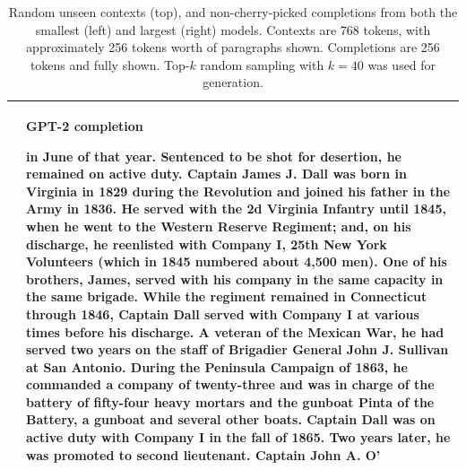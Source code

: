\documentclass{article}
\begin{document}
\begin{table}[t]
\begin{center}
\begin{tabular}{|p{8cm}|p{8cm}|}
  &
  \centerline{\textbf{GPT-2 completion}}
 in June of that year. Sentenced to be shot for desertion, he remained on active duty.
\newline\newline
Captain James J. Dall was born in Virginia in 1829 during the Revolution and joined his father in the Army in 1836. He served with the 2d Virginia Infantry until 1845, when he went to the Western Reserve Regiment; and, on his discharge, he reenlisted with Company I, 25th New York Volunteers (which in 1845 numbered about 4,500 men). One of his brothers, James, served with his company in the same capacity in the same brigade. While the regiment remained in Connecticut through 1846, Captain Dall served with Company I at various times before his discharge. A veteran of the Mexican War, he had served two years on the staff of Brigadier General John J. Sullivan at San Antonio. During the Peninsula Campaign of 1863, he commanded a company of twenty-three and was in charge of the battery of fifty-four heavy mortars and the gunboat Pinta of the Battery, a gunboat and several other boats. Captain Dall was on active duty with Company I in the fall of 1865. Two years later, he was promoted to second lieutenant.
\newline\newline
Captain John A. O'

 \\
\hline


\end{tabular}
\caption{Random unseen contexts (top), and non-cherry-picked completions from both the smallest (left) and largest (right) models. Contexts are 768 tokens, with approximately 256 tokens worth of paragraphs shown.  Completions are 256 tokens and fully shown.
Top-$k$ random sampling with $k = 40$ was used for generation.}
\label{samplescompare4}
\end{center}
\end{table}
\end{document}
